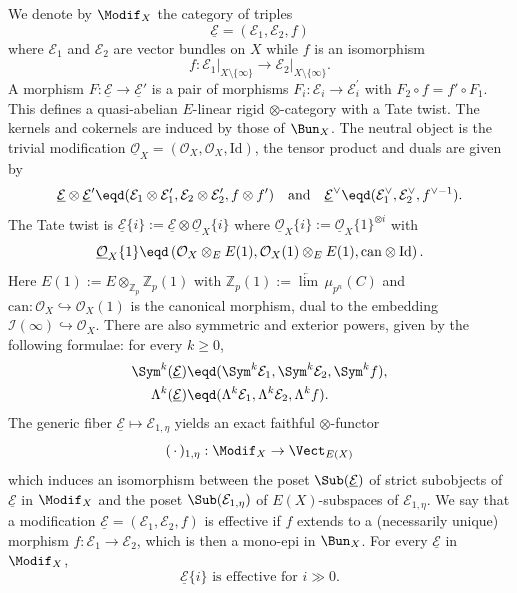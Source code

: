We denote by $\Modif_{X}$ the category of triples
\[
\underline{\mathcal{E}}=(\mathcal{E}_{1},\mathcal{E}_{2},f)
\]
where $\mathcal{E}_{1}$ and $\mathcal{E}_{2}$ are vector bundles on $X$ while $f$ is an isomorphism
\[
f:\mathcal{E}_{1}\vert_{X\setminus\{\infty\}}\rightarrow\mathcal{E}_{2}\vert_{X\setminus\{\infty\}}.
\]
A morphism $F:\underline{\mathcal{E}}\rightarrow\underline{\mathcal{E}}'$ is a pair of morphisms $F_{i}:\mathcal{E}_{i}\rightarrow\mathcal{E}_{i}^{\prime}$ with $F_{2}\circ f=f'\circ F_{1}$. This defines a quasi-abelian $E$-linear rigid $\otimes$-category with a Tate twist. The kernels and cokernels are induced by those of $\Bun_{X}$. The neutral object is the trivial modification $\underline{\mathcal{O}}_{X}=(\mathcal{O}_{X},\mathcal{O}_{X},\mathrm{Id})$, the tensor product and duals are given by
\[
\underline{\mathcal{E}}\otimes\underline{\mathcal{E}}^{\prime}\eqd(\mathcal{E}_{1}\otimes\mathcal{E}_{1}^{\prime},\mathcal{E}_{2}\otimes\mathcal{E}_{2}^{\prime},f\otimes f')\quad\text{and}\quad\underline{\mathcal{E}}^{\vee}\eqd(\mathcal{E}_{1}^{\vee},\mathcal{E}_{2}^{\vee},f^{\vee-1}).
\]
The Tate twist is $\underline{\mathcal{E}}\{i\}:=\underline{\mathcal{E}}\otimes\underline{\mathcal{O}}_{X}\{i\}$ where $\underline{\mathcal{O}}_{X}\{i\}:=\underline{\mathcal{O}}_{X}\{1\}^{\otimes i}$ with
\[
\underline{\mathcal{O}}_{X}\{1\}\eqd\left(\mathcal{O}_{X}\otimes_{E}E(1),\mathcal{O}_{X}(1)\otimes_{E}E(1),\mathrm{can}\otimes\mathrm{Id}\right).
\]
Here $E(1):=E\otimes_{\mathbb{Z}_{p}}\mathbb{Z}_{p}(1)$ with $\mathbb{Z}_{p}(1):=\underleftarrow{\lim}\,\mu_{p^{n}}(C)$ and $\mathrm{can}:\mathcal{O}_{X}\hookrightarrow\mathcal{O}_{X}(1)$ is the canonical morphism, dual to the embedding $\mathcal{I}(\infty)\hookrightarrow\mathcal{O}_{X}$. There are also symmetric and exterior powers, given by the following formulae: for every $k\geq0$,
\begin{align*}
\Sym^{k}(\underline{\mathcal{E}}) & \eqd (\Sym^{k}\mathcal{E}_{1},\Sym^{k}\mathcal{E}_{2},\Sym^{k}f),\\
\Lambda^{k}(\underline{\mathcal{E}}) & \eqd (\Lambda^{k}\mathcal{E}_{1},\Lambda^{k}\mathcal{E}_{2},\Lambda^{k}f).
\end{align*}
The generic fiber $\underline{\mathcal{E}}\mapsto\mathcal{E}_{1,\eta}$ yields an exact faithful $\otimes$-functor
\[
({\,\cdot\,})_{1,\eta}:\Modif_{X}\rightarrow\Vect_{E(X)}
\]
which induces an isomorphism between the poset $\Sub(\underline{\mathcal{E}})$ of strict subobjects of $\underline{\mathcal{E}}$ in $\Modif_{X}$ and the poset $\Sub(\mathcal{E}_{1,\eta})$ of $E(X)$-subspaces of $\mathcal{E}_{1,\eta}$. We say that a modification $\underline{\mathcal{E}}=(\mathcal{E}_{1},\mathcal{E}_{2},f)$ is effective if $f$ extends to a (necessarily unique) morphism $f:\mathcal{E}_{1}\rightarrow\mathcal{E}_{2}$, which is then a mono-epi in $\Bun_{X}$. For every $\underline{\mathcal{E}}$ in $\Modif_{X}$,
\[
\underline{\mathcal{E}}\{i\}\text{ is effective for }i\gg0.
\]


